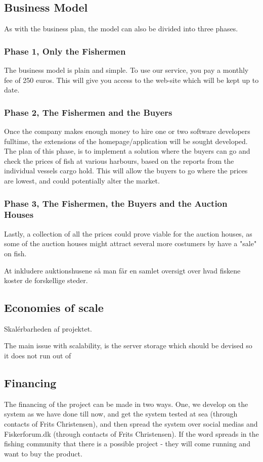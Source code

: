 \documentclass[a4paper,10pt,oneside,fleqn]{article}
\begin{document}
\subsection{Business Model}
As with the business plan, the model can also be divided into three phases. 
\subsubsection{Phase 1, Only the Fishermen}
The business model is plain and simple. To use our service, you pay a monthly fee of 250 euros. This will give you access to the web-site which will be kept up to date. 

\subsubsection{Phase 2, The Fishermen and the Buyers}
Once the company makes enough money to hire one or two software developers fulltime, the extensions of the homepage/application will be sought developed. The plan of this phase, is to implement a solution where the buyers can go and check the prices of fish at various harbours, based on the reports from the individual vessels cargo hold. This will allow the buyers to go where the prices are lowest, and could potentially alter the market. 

\subsubsection{Phase 3, The Fishermen, the Buyers and the Auction Houses}
Lastly, a collection of all the prices could prove viable for the auction houses, as some of the auction houses might attract several more costumers by have a "sale" on fish.

At inkludere auktionshusene så man får en samlet oversigt over hvad fiskene koster de forskellige steder.

\subsection{Economies of scale}
Skalérbarheden af projektet. 

The main issue with scalability, is the server storage which should be devised so it does not run out of 

\subsection{Financing}
The financing of the project can be made in two ways. One, we develop on the system as we have done till now, and get the system tested at sea (through contacts of Frits Christensen), and then spread the system over social medias and Fiskerforum.dk (through contacts of Frits Christensen). If the word spreads in the fishing community that there is a possible project - they will come running and want to buy the product. 
\end{document}
